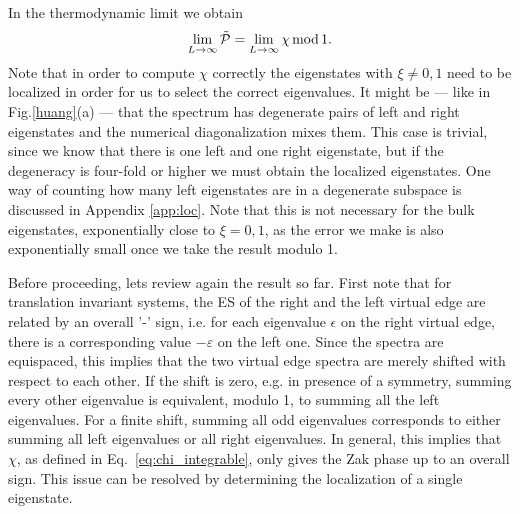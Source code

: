 \documentclass[twocolumn,amsmath,longbibliography,amssymb,superscriptaddress]{revtex4-1}
\begin{document}
In the thermodynamic limit we obtain
\begin{equation}
\lim_{L \rightarrow \infty} \tilde{\mathcal{P}} = \lim_{L \rightarrow \infty} \chi \, {\rm mod } \, 1.
\label{eq:ptilde_eq_chi}
\end{equation}
Note that in order to compute $\chi$ correctly the eigenstates with $\xi \neq 0,1$ need to be localized in order for us to select the correct eigenvalues. It might be --- like in Fig.\ref{huang}(a) --- that the spectrum has degenerate pairs of left and right eigenstates and the numerical diagonalization mixes them. This case is trivial, since we know that there is one left and one right eigenstate, but if the degeneracy is four-fold or higher we must obtain the localized eigenstates. One way of counting how many left eigenstates are in a degenerate subspace is discussed in Appendix \ref{app:loc}. Note that this is not necessary for the bulk eigenstates, exponentially close to $\xi=0,1$, as the error we make is also exponentially small once we take the result modulo 1.  

Before proceeding, lets review again the result so far. First note that for translation invariant systems, the ES of the right and the left virtual edge are related by an overall '-' sign, i.e. for each eigenvalue $\epsilon$ on the right virtual edge, there is a corresponding value $-\varepsilon$ on the left one. 
Since the spectra are equispaced, this implies that the two virtual edge spectra are merely shifted with respect to each other.
If the shift is zero, e.g.  in presence of a symmetry, summing every other eigenvalue is equivalent, modulo 1, to summing all the left eigenvalues. For a finite shift, summing all odd eigenvalues corresponds to either summing all left eigenvalues or all right eigenvalues. In general, this implies that $\chi$, as defined in Eq.~\eqref{eq:chi_integrable}, only gives the Zak phase up to an overall sign. This issue can be resolved by determining the localization of a single eigenstate. 
\end{document}
